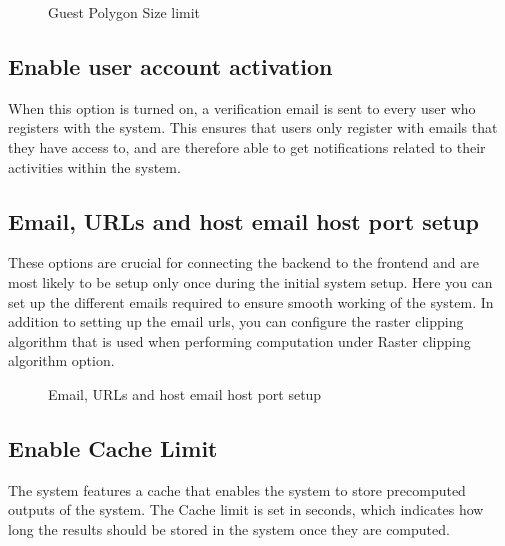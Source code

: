 \documentclass[letterpaper,10pt,english]{sphinxmanual}
\let\sphinxpxdimen\pdfpxdimen\else\newdimen\sphinxpxdimen
\begin{document}
\begin{figure}[H]
\centering
\capstart

\noindent\sphinxincludegraphics[width=744\sphinxpxdimen,height=584\sphinxpxdimen]{{admin3}.png}
\caption{Guest Polygon Size limit}\label{\detokenize{Introduction/admin:id3}}\end{figure}


\subsection{Enable user account activation}
\label{\detokenize{Introduction/admin:enable-user-account-activation}}
\sphinxAtStartPar
When this option is turned on, a verification email is sent to every user who registers with the system. This ensures that users only register with emails that they have access to, and are therefore able to get notifications related to their activities within the system.


\subsection{Email, URLs and host email host port setup}
\label{\detokenize{Introduction/admin:email-urls-and-host-email-host-port-setup}}
\sphinxAtStartPar
These options are crucial for connecting the backend to the frontend and are most likely to be setup only once during the initial system setup. Here you can set up the different emails required to ensure smooth working of the system. In addition to setting up the email urls, you can configure the raster clipping algorithm that is used when performing computation under Raster clipping algorithm option.

\begin{figure}[H]
\centering
\capstart

\noindent\sphinxincludegraphics[width=667\sphinxpxdimen,height=585\sphinxpxdimen]{{admin4a}.png}
\caption{Email, URLs and host email host port setup}\label{\detokenize{Introduction/admin:id4}}\end{figure}


\subsection{Enable Cache Limit}
\label{\detokenize{Introduction/admin:enable-cache-limit}}
\sphinxAtStartPar
The system features a cache that enables the system to store pre\sphinxhyphen{}computed outputs of the system. The Cache limit is set in seconds, which indicates how long the results should be stored in the system once they are computed.
\end{document}
